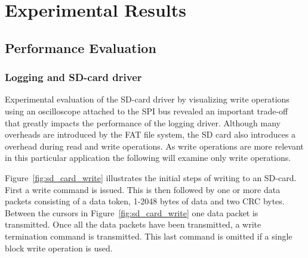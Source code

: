 

\chapter{Experimental Results}

\section{Performance Evaluation}

\subsection{Logging and SD-card driver} \label{logging_perf}

Experimental evaluation of the SD-card driver by visualizing write operations using an oscilloscope attached to the SPI bus revealed an important trade-off that greatly impacts the performance of the logging driver. Although many overheads are introduced by the FAT file system, the SD card also introduces a overhead during read and write operations. As write operations are more relevant in this particular application the following will examine only write operations.

Figure~\ref{fig:sd_card_write} illustrates the initial steps of writing to an SD-card. First a write command is issued. This is then followed by one or more data packets consisting of a data token, 1-2048 bytes of data and two CRC bytes. Between the cursors in Figure~\ref{fig:sd_card_write} one data packet is transmitted. Once all the data packets have been transmitted, a write termination command is transmitted. This last command is omitted if a single block write operation is used.

